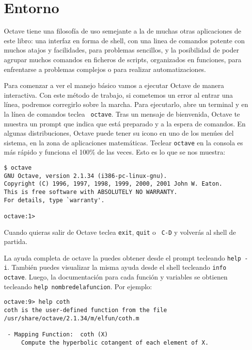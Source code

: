 
\section{Entorno}


Octave  tiene una  filosofía de  uso semejante  a la  de muchas  otras
aplicaciones de  este libro: una interfaz  en forma de shell,  con una
linea  de  comandos potente  con  muchos  atajos y  facilidades,  para
problemas sencillos, y la posibilidad de poder agrupar muchos comandos
en ficheros de  scripts, organizados en funciones,  para enfrentarse a
problemas complejos o para realizar automatizaciones.

Para comenzar a ver el manejo básico vamos a ejecutar Octave de manera
interactiva.  Con  este  método  de trabajo,  si  cometemos  un  error
al  entrar  una  línea,  podremos corregirlo  sobre  la  marcha.  Para
ejecutarlo, abre  un terminal y  en la  línea de comandos  teclea {\tt
octave}. Tras  un mensaje de  bienvenida, Octave te muestra  un prompt
que indica  que está preparado y  a la espera de  comandos. En algunas
distribuciones, Octave puede  tener su icono en uno de  los menúes del
sistema, en la zona de  aplicaciones matemáticas. Teclear {\tt octave}
en la consola es más rápido y  funciona el 100\% de las veces. Esto es
lo que se nos muestra:

\begin{verbatim}
$ octave
GNU Octave, version 2.1.34 (i386-pc-linux-gnu).
Copyright (C) 1996, 1997, 1998, 1999, 2000, 2001 John W. Eaton.
This is free software with ABSOLUTELY NO WARRANTY.
For details, type `warranty'.

octave:1>
\end{verbatim}

Cuando quieras  salir de Octave teclea  {\tt exit}, {\tt quit}  o {\tt
C-D} y volverás al shell de partida.

La  ayuda  completa  de  octave  la puedes  obtener  desde  el  prompt
tecleando  {\tt help  -i}. También  puedes visualizar  la misma  ayuda
desde el  shell tecleando {\tt  info octave}. Luego,  la documentación
para  cada  función  y  variables  se  obtienen  tecleando  {\tt  help
nombredelafuncion}. Por ejemplo:

\begin{verbatim}
octave:9> help coth
coth is the user-defined function from the file
/usr/share/octave/2.1.34/m/elfun/coth.m

 - Mapping Function:  coth (X)
     Compute the hyperbolic cotangent of each element of X.
\end{verbatim}

